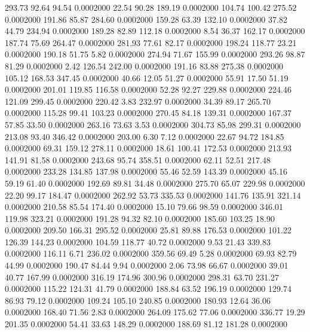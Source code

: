  293.73   92.64   94.54   0.0002000
  22.54   90.28  189.19   0.0002000
 104.74  100.42  275.52   0.0002000
 191.86   85.87  284.60   0.0002000
 159.28   63.39  132.10   0.0002000
  37.82   44.79  234.94   0.0002000
 189.28   82.89  112.18   0.0002000
   8.54   36.37  162.17   0.0002000
 187.74   75.69  264.47   0.0002000
 281.93   77.61   82.17   0.0002000
 198.24  118.77   23.21   0.0002000
 190.18   51.75    5.82   0.0002000
 274.94   71.67  155.99   0.0002000
 293.26   98.87   81.29   0.0002000
   2.42  126.54  242.00   0.0002000
 191.16   83.88  275.38   0.0002000
 105.12  168.53  347.45   0.0002000
  40.66   12.05   51.27   0.0002000
  55.91   17.50   51.19   0.0002000
 201.01  119.85  116.58   0.0002000
  52.28   92.27  229.88   0.0002000
 224.46  121.09  299.45   0.0002000
 220.42    3.83  232.97   0.0002000
  34.39   89.17  265.70   0.0002000
 115.28   99.41  103.23   0.0002000
 270.45   84.18  139.31   0.0002000
 167.37   57.85   33.50   0.0002000
 263.16   73.63    3.53   0.0002000
 304.73   85.98  299.31   0.0002000
 213.08   93.40  346.42   0.0002000
 203.00    6.30    7.12   0.0002000
  22.67   94.72  184.85   0.0002000
  69.31  159.12  278.11   0.0002000
  18.61  100.41  172.53   0.0002000
 213.93  141.91   81.58   0.0002000
 243.68   95.74  358.51   0.0002000
  62.11   52.51  217.48   0.0002000
 233.28  134.85  137.98   0.0002000
  55.46   52.59  143.39   0.0002000
  45.16   59.19   61.40   0.0002000
 192.69   89.81   34.48   0.0002000
 275.70   65.07  229.98   0.0002000
  22.20   99.17  184.47   0.0002000
 262.92   53.73  335.53   0.0002000
 141.76  135.91  321.14   0.0002000
 210.58   85.54  174.40   0.0002000
  15.10   79.66   98.59   0.0002000
 346.01  119.98  323.21   0.0002000
 191.28   94.32   82.10   0.0002000
 185.60  103.25   18.90   0.0002000
 209.50  166.31  295.52   0.0002000
  25.81   89.88  176.53   0.0002000
 101.22  126.39  144.23   0.0002000
 104.59  118.77   40.72   0.0002000
   9.53   21.43  339.83   0.0002000
 116.11    6.71  236.02   0.0002000
 359.56   69.49    5.28   0.0002000
  69.93   82.79   44.99   0.0002000
 190.47   84.44    9.94   0.0002000
   2.06   73.98   66.67   0.0002000
  39.01   40.77  167.99   0.0002000
 316.19  174.96  300.96   0.0002000
 298.31   63.70  231.27   0.0002000
 115.22  124.31   41.79   0.0002000
 188.84   63.52  196.19   0.0002000
 129.74   86.93   79.12   0.0002000
 109.24  105.10  240.85   0.0002000
 180.93   12.64   36.06   0.0002000
 168.40   71.56    2.83   0.0002000
 264.09  175.62   77.06   0.0002000
 336.77   19.29  201.35   0.0002000
  54.41   33.63  148.29   0.0002000
 188.69   81.12  181.28   0.0002000

